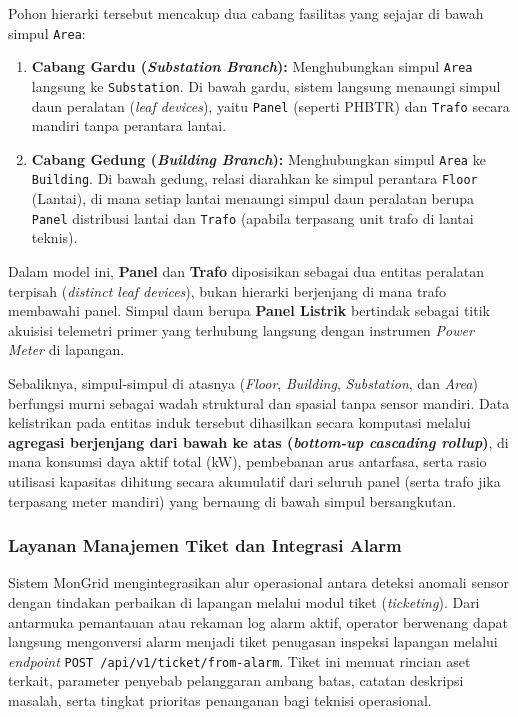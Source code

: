 Pohon hierarki tersebut mencakup dua cabang fasilitas yang sejajar di bawah simpul \texttt{Area}:
\begin{enumerate}[label=\alph*., leftmargin=*, itemsep=0pt]
  \item \textbf{Cabang Gardu (\textit{Substation Branch}):} Menghubungkan simpul \texttt{Area} langsung ke \texttt{Substation}. Di bawah gardu, sistem langsung menaungi simpul daun peralatan (\textit{leaf devices}), yaitu \texttt{Panel} (seperti PHBTR) dan \texttt{Trafo} secara mandiri tanpa perantara lantai.
  \item \textbf{Cabang Gedung (\textit{Building Branch}):} Menghubungkan simpul \texttt{Area} ke \texttt{Building}. Di bawah gedung, relasi diarahkan ke simpul perantara \texttt{Floor} (Lantai), di mana setiap lantai menaungi simpul daun peralatan berupa \texttt{Panel} distribusi lantai dan \texttt{Trafo} (apabila terpasang unit trafo di lantai teknis).
\end{enumerate}

Dalam model ini, \textbf{Panel} dan \textbf{Trafo} diposisikan sebagai dua entitas peralatan terpisah (\textit{distinct leaf devices}), bukan hierarki berjenjang di mana trafo membawahi panel. Simpul daun berupa \textbf{Panel Listrik} bertindak sebagai titik akuisisi telemetri primer yang terhubung langsung dengan instrumen \textit{Power Meter} di lapangan. 

Sebaliknya, simpul-simpul di atasnya (\textit{Floor}, \textit{Building}, \textit{Substation}, dan \textit{Area}) berfungsi murni sebagai wadah struktural dan spasial tanpa sensor mandiri. Data kelistrikan pada entitas induk tersebut dihasilkan secara komputasi melalui \textbf{agregasi berjenjang dari bawah ke atas (\textit{bottom-up cascading rollup})}, di mana konsumsi daya aktif total (kW), pembebanan arus antarfasa, serta rasio utilisasi kapasitas dihitung secara akumulatif dari seluruh panel (serta trafo jika terpasang meter mandiri) yang bernaung di bawah simpul bersangkutan.

\subsubsection{Layanan Manajemen Tiket dan Integrasi Alarm}

Sistem MonGrid mengintegrasikan alur operasional antara deteksi anomali sensor dengan tindakan perbaikan di lapangan melalui modul tiket (\textit{ticketing}). Dari antarmuka pemantauan atau rekaman log alarm aktif, operator berwenang dapat langsung mengonversi alarm menjadi tiket penugasan inspeksi lapangan melalui \textit{endpoint} \texttt{POST /api/v1/ticket/from-alarm}. Tiket ini memuat rincian aset terkait, parameter penyebab pelanggaran ambang batas, catatan deskripsi masalah, serta tingkat prioritas penanganan bagi teknisi operasional.

